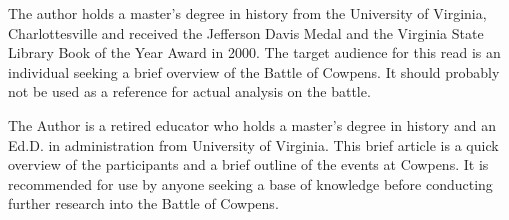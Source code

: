 The author holds a master's degree in history from the University of Virginia,
Charlottesville and received the Jefferson Davis Medal and the Virginia State
Library Book of the Year Award in 2000. The target audience for this read is
an individual seeking a brief overview of the Battle of Cowpens. It should
probably not be used as a reference for actual analysis on the battle. 

The Author is a retired educator who holds a master's degree in history and an
Ed.D. in administration from University of Virginia.  This brief article is a
quick overview of the participants and a brief outline of the events at
Cowpens.  It is recommended for use by anyone seeking a base of knowledge
before conducting further research into the Battle of Cowpens.
